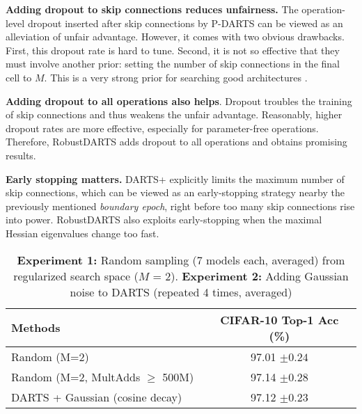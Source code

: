 \documentclass[runningheads]{llncs}
\begin{document}
\textbf{Adding dropout to skip connections reduces unfairness.}
The operation-level dropout \cite{srivastava2014dropout} inserted after skip connections by P-DARTS \cite{chen2019progressive} can be viewed as an alleviation of unfair advantage.  However, it comes with two obvious drawbacks. First, this dropout rate is hard to tune. Second, it is not so effective that they must involve another prior: setting the number of skip connections in the final cell to $M$. This is a very strong prior for searching good architectures \cite{liang2019darts}. 

\textbf{Adding dropout to all operations also helps}. Dropout troubles the training of skip connections and thus weakens the unfair advantage. Reasonably, higher dropout rates are more effective, especially for parameter-free operations. Therefore, RobustDARTS \cite{zela2020understanding} adds dropout to all operations and obtains promising results. 





\textbf{Early stopping matters.}
DARTS+ \cite{liang2019darts} explicitly limits the maximum number of skip connections, which can be viewed as an early-stopping strategy nearby the previously mentioned \emph{boundary epoch}, right before too many skip connections rise into power. RobustDARTS \cite{zela2020understanding} also exploits early-stopping when the maximal Hessian eigenvalues change too fast.

\setlength{\tabcolsep}{4pt}
\begin{table}
	\begin{center}
	\caption{\textbf{Experiment 1:} Random sampling (7 models each, averaged) from regularized search space ($M$ = 2). \textbf{Experiment 2:} Adding Gaussian noise to DARTS (repeated 4 times, averaged)}
	\label{tab:noisy-darts}	
		\begin{footnotesize}
		\begin{tabular}{lc}
				\hline\noalign{\smallskip}
				Methods  & CIFAR-10 Top-1 Acc (\%) \\
				\hline\noalign{\smallskip} Random (M=2)  & 97.01 $\pm0.24 $  \\
				Random (M=2, MultAdds $\ge$ 500M) $ $  & 97.14 $\pm 0.28$  \\
				\hline\noalign{\smallskip}
				DARTS + Gaussian (cosine decay)  & 97.12 $\pm 0.23$  \\


				\hline
\end{tabular}
		\end{footnotesize}
	\end{center}
\end{table}
\end{document}
